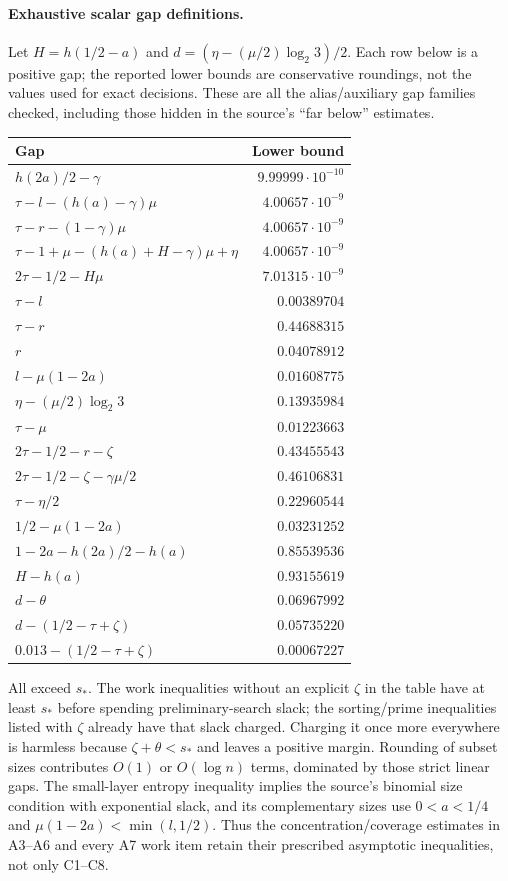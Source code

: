\paragraph{Exhaustive scalar gap definitions.}
Let $H=h(1/2-a)$ and $d=(\eta-(\mu/2)\log_2 3)/2$.
Each row below is a positive gap; the reported lower bounds are conservative
roundings, not the values used for exact decisions. These are all the
alias/auxiliary gap families checked, including those hidden in the source's
``far below'' estimates.
\begin{center}\scriptsize
\begin{tabular}{@{}p{.70\linewidth}r@{}}\toprule
Gap & Lower bound\\\midrule
$h(2a)/2-\gamma$ & $9.99999\cdot10^{-10}$\\
$\tau-l-(h(a)-\gamma)\mu$ & $4.00657\cdot10^{-9}$\\
$\tau-r-(1-\gamma)\mu$ & $4.00657\cdot10^{-9}$\\
$\tau-1+\mu-(h(a)+H-\gamma)\mu+\eta$ & $4.00657\cdot10^{-9}$\\
$2\tau-1/2-H\mu$ & $7.01315\cdot10^{-9}$\\
$\tau-l$ & $0.00389704$\\
$\tau-r$ & $0.44688315$\\
$r$ & $0.04078912$\\
$l-\mu(1-2a)$ & $0.01608775$\\
$\eta-(\mu/2)\log_2 3$ & $0.13935984$\\
$\tau-\mu$ & $0.01223663$\\
$2\tau-1/2-r-\zeta$ & $0.43455543$\\
$2\tau-1/2-\zeta-\gamma\mu/2$ & $0.46106831$\\
$\tau-\eta/2$ & $0.22960544$\\
$1/2-\mu(1-2a)$ & $0.03231252$\\
$1-2a-h(2a)/2-h(a)$ & $0.85539536$\\
$H-h(a)$ & $0.93155619$\\
$d-\theta$ & $0.06967992$\\
$d-(1/2-\tau+\zeta)$ & $0.05735220$\\
$0.013-(1/2-\tau+\zeta)$ & $0.00067227$\\\bottomrule
\end{tabular}
\end{center}
All exceed $s_*$. The work inequalities without an explicit $\zeta$ in
the table have at least $s_*$ before spending preliminary-search slack;
the sorting/prime inequalities listed with $\zeta$ already have that
slack charged. Charging it once more everywhere is harmless because
$\zeta+\theta<s_*$ and leaves a positive margin. Rounding of subset
sizes contributes $O(1)$ or $O(\log n)$ terms, dominated by those strict
linear gaps. The small-layer entropy inequality implies the source's
binomial size condition with exponential slack, and its complementary
sizes use $0<a<1/4$ and $\mu(1-2a)<\min(l,1/2)$.
Thus the concentration/coverage estimates in A3--A6 and every A7 work
item retain their prescribed asymptotic inequalities, not only C1--C8.

